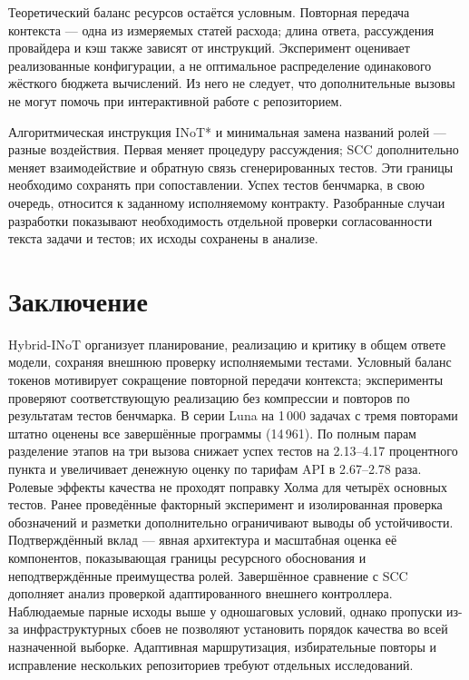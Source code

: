 Теоретический баланс ресурсов остаётся условным. Повторная передача контекста --- одна из измеряемых статей расхода; длина ответа, рассуждения провайдера и кэш также зависят от инструкций. Эксперимент оценивает реализованные конфигурации, а не оптимальное распределение одинакового жёсткого бюджета вычислений. Из него не следует, что дополнительные вызовы не могут помочь при интерактивной работе с репозиторием.

Алгоритмическая инструкция INoT* и минимальная замена названий ролей --- разные воздействия. Первая меняет процедуру рассуждения; SCC дополнительно меняет взаимодействие и обратную связь сгенерированных тестов. Эти границы необходимо сохранять при сопоставлении. Успех тестов бенчмарка, в свою очередь, относится к заданному исполняемому контракту. Разобранные случаи разработки показывают необходимость отдельной проверки согласованности текста задачи и тестов; их исходы сохранены в анализе.








\section{Заключение}
Hybrid-INoT организует планирование, реализацию и критику в общем ответе модели, сохраняя внешнюю проверку исполняемыми тестами. Условный баланс токенов мотивирует сокращение повторной передачи контекста; эксперименты проверяют соответствующую реализацию без компрессии и повторов по результатам тестов бенчмарка. В серии Luna на 1\,000 задачах с тремя повторами штатно оценены все завершённые программы (14\,961). По полным парам разделение этапов на три вызова снижает успех тестов на 2.13--4.17 процентного пункта и увеличивает денежную оценку по тарифам API в 2.67--2.78 раза. Ролевые эффекты качества не проходят поправку Холма для четырёх основных тестов. Ранее проведённые факторный эксперимент и изолированная проверка обозначений и разметки дополнительно ограничивают выводы об устойчивости. Подтверждённый вклад --- явная архитектура и масштабная оценка её компонентов, показывающая границы ресурсного обоснования и неподтверждённые преимущества ролей. Завершённое сравнение с SCC дополняет анализ проверкой адаптированного внешнего контроллера. Наблюдаемые парные исходы выше у одношаговых условий, однако пропуски из-за инфраструктурных сбоев не позволяют установить порядок качества во всей назначенной выборке. Адаптивная маршрутизация, избирательные повторы и исправление нескольких репозиториев требуют отдельных исследований.


